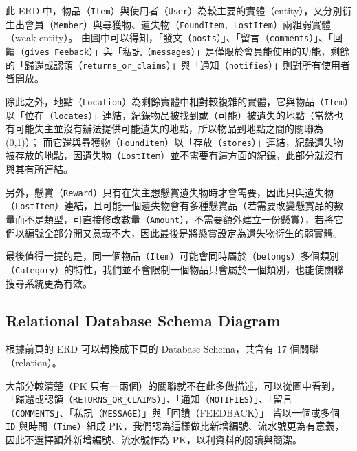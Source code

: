 \documentclass[12pt,a4paper]{article}
\begin{document}
\newpage
此 ERD 中，物品（\verb|Item|）與使用者（\verb|User|）為較主要的實體（entity），又分別衍生出會員（\verb|Member|）與尋獲物、遺失物（\verb|FoundItem, LostItem|）兩組弱實體（weak entity）。
由圖中可以得知，「發文（\verb|posts|）」、「留言（\verb|comments|）」、「回饋（\verb|gives Feeback|）」與「私訊（\verb|messages|）」是僅限於會員能使用的功能，剩餘的「歸還或認領（\verb|returns_or_claims|）」與「通知（\verb|notifies|）」則對所有使用者皆開放。

除此之外，地點（\verb|Location|）為剩餘實體中相對較複雜的實體，它與物品（\verb|Item|）以「位在（\verb|locates|）」連結，紀錄物品被找到或（可能）被遺失的地點（當然也有可能失主並沒有辦法提供可能遺失的地點，所以物品到地點之間的關聯為 (0,1)）；
而它還與尋獲物（\verb|FoundItem|）以「存放（\verb|stores|）」連結，紀錄遺失物被存放的地點，因遺失物（\verb|LostItem|）並不需要有這方面的紀錄，此部分就沒有與其有所連結。

另外，懸賞（\verb|Reward|）只有在失主想懸賞遺失物時才會需要，因此只與遺失物（\verb|LostItem|）連結，且可能一個遺失物會有多種懸賞品（若需要改變懸賞品的數量而不是類型，可直接修改數量（\verb|Amount|），不需要額外建立一份懸賞），若將它們以編號全部分開又意義不大，因此最後是將懸賞設定為遺失物衍生的弱實體。

最後值得一提的是，同一個物品（\verb|Item|）可能會同時屬於（\verb|belongs|）多個類別（\verb|Category|）的特性，我們並不會限制一個物品只會屬於一個類別，也能使關聯搜尋系統更為有效。

\subsection{Relational Database Schema Diagram}
\label{subsection:schema}

根據前頁的 ERD 可以轉換成下頁的 Database Schema，共含有 17 個關聯（relation）。

大部分較清楚（PK 只有一兩個）的關聯就不在此多做描述，可以從圖中看到，「歸還或認領（\verb|RETURNS_OR_CLAIMS|）」、「通知（\verb|NOTIFIES|）」、「留言（\verb|COMMENTS|」、「私訊（\verb|MESSAGE|）」與「回饋（FEEDBACK）」
皆以一個或多個 \verb|ID| 與時間（\verb|Time|）組成 PK，我們認為這樣做比新增編號、流水號更為有意義，因此不選擇額外新增編號、流水號作為 PK，以利資料的閱讀與簡潔。
\end{document}
